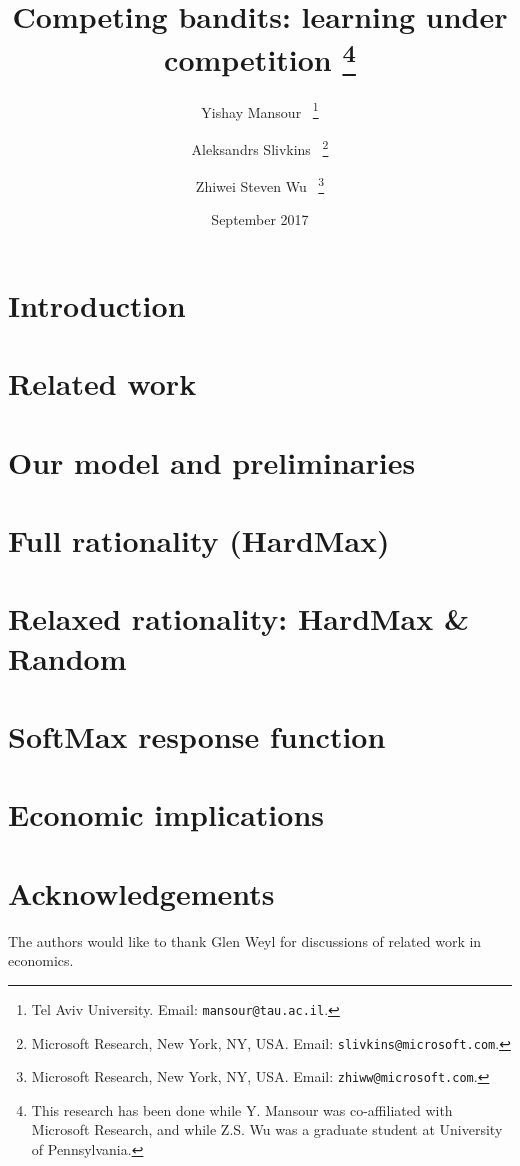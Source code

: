 \documentclass[11pt]{article}
\title{Competing bandits: learning under competition%
\footnote{This research has been done while Y. Mansour was co-affiliated with Microsoft Research, and while Z.S. Wu was a graduate student at University of Pennsylvania.}}
\author{Yishay Mansour%
~\thanks{Tel Aviv University.
Email: {\tt  mansour@tau.ac.il}.}
\and
Aleksandrs Slivkins%
~\thanks{Microsoft Research, New York, NY, USA.
Email: {\tt slivkins@microsoft.com}.} \and
Zhiwei Steven Wu%
~\thanks{Microsoft Research, New York, NY, USA.
Email: {\tt zhiww@microsoft.com}.}
}
\date{September 2017}
\begin{document}
\maketitle

\begin{abstract}

\end{abstract}


\section{Introduction}
\label{sec:intro}


\section{Related work}
\label{sec:related-work}



\section{Our model and preliminaries}
\label{sec:model}


\section{Full rationality (HardMax)}
\label{sec:rational}


\section{Relaxed rationality: HardMax \& Random}
\label{sec:random}


\section{SoftMax response function}
\label{sec:soft}


\section{Economic implications}
\label{sec:welfare}


\section*{Acknowledgements}
The authors would like to thank Glen Weyl for discussions of related work in economics.
\end{document}

